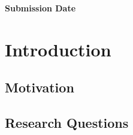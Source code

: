 \documentclass[english]{lni}
\begin{document}
\begin{titlepage}
\begin{center}
        \vspace{0.65cm}

        {\large\textbf{Submission Date}\par}

        \vspace{0.15cm}

        {\large\phantom{28 August 2026}\par}

        \vspace{1.3cm}

    \end{center}

\end{titlepage}

\clearpage


\begin{abstract}


\end{abstract}



\clearpage
\tableofcontents
\clearpage



\section{Introduction}
\label{sec:introduction}



\subsection{Motivation}
\label{sec:motivation}



\subsection{Research Questions}
\label{sec:research-questions}
\end{document}
